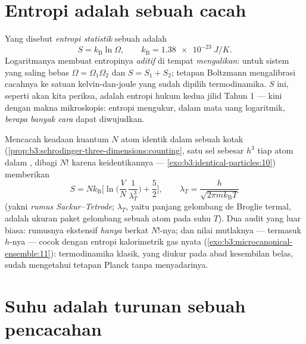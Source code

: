 \section{Entropi adalah sebuah cacah}

\begin{definition}\label{def:b3:microcanonical-ensemble:entropy}
Yang disebut \emph{entropi statistik} sebuah  adalah
\[
S = k_{\text{B}}\ln\Omega , \qquad
k_{\text{B}} = \qty{1.38e-23}{J/K} .
\]
Logaritmanya membuat entropinya \emph{aditif} di tempat
 \emph{mengalikan}: untuk sistem yang saling bebas
$\Omega = \Omega_1\Omega_2$ dan $S = S_1 + S_2$; tetapan Boltzmann
mengalibrasi cacahnya ke satuan kelvin-dan-joule yang sudah dipilih
termodinamika. $S$ ini, seperti akan kita periksa, adalah entropi hukum
kedua jilid Tahun 1 --- kini dengan makna mikroskopis: entropi mengukur,
dalam mata uang logaritmik, \emph{berapa banyak cara} 
dapat diwujudkan.
\end{definition}

\begin{proposition}\label{prop:b3:microcanonical-ensemble:gas}
Mencacah keadaan kuantum $N$ atom identik dalam sebuah kotak
(\cref{prop:b3:schrodinger-three-dimensions:counting}, satu sel sebesar
$h^3$ tiap atom dalam , dibagi $N!$ karena keidentikannya ---
\cref{exo:b3:identical-particles:10}) memberikan
\[
S = Nk_{\text{B}}\Big[\ln\Big(\frac VN\,\frac1{\lambda_T^3}\Big)
 + \frac52\Big] , \qquad
\lambda_T = \frac{h}{\sqrt{2\pi mk_{\text{B}}T}}
\]
(yakni \emph{rumus Sackur--Tetrode}; $\lambda_T$, yaitu panjang
gelombang de Broglie termal, adalah ukuran paket gelombang sebuah atom
pada suhu $T$). Dua audit yang luar biasa: rumusnya ekstensif
\emph{hanya} berkat $N!$-nya; dan nilai mutlaknya --- termasuk $h$-nya
--- cocok dengan entropi kalorimetrik gas nyata
(\cref{exo:b3:microcanonical-ensemble:11}): termodinamika klasik, yang
diukur pada abad kesembilan belas, sudah mengetahui tetapan Planck tanpa
menyadarinya.
\end{proposition}
\admitted

\section{Suhu adalah turunan sebuah pencacahan}


